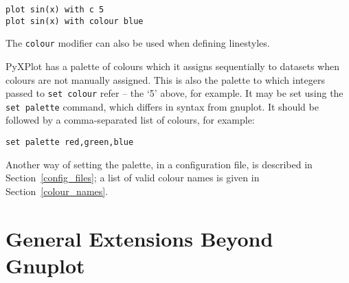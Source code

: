 \begin{verbatim}
plot sin(x) with c 5
plot sin(x) with colour blue
\end{verbatim}

\noindent The \texttt{colour} modifier can also be used when defining linestyles.

 PyXPlot has a palette of colours which it assigns
sequentially to datasets when colours are not manually assigned. This is also
the palette to which integers passed to \texttt{set colour} refer -- the `5'
above, for example. It may be set using the \texttt{set palette} command, which
differs in syntax from gnuplot. It should be followed by a comma-separated list
of colours, for example:

\begin{verbatim}
set palette red,green,blue
\end{verbatim}

Another way of setting the palette, in a configuration file, is described in
Section~\ref{config_files}; a list of valid colour names is given in
Section~\ref{colour_names}.

\section{General Extensions Beyond Gnuplot}

